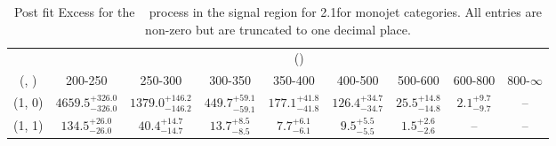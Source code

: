 \begin{table}[h!]
\tiny
\centering
\caption{Post fit Excess for the \zInv~ process in the signal region for 2.1\ifb for monojet categories. All entries are non-zero but are truncated to one decimal place.\label{tab:excessseppost_sig_zinv_mono}}
\begin{tabular}
{ccccccccc}
	\hline\hline
	& \multicolumn{8}{c}{\scalht (\gev)} \\ 
	 (\njet,  \nb) & 200-250 & 250-300 & 300-350 & 350-400 & 400-500 & 500-600 & 600-800 & 800-$\infty$ \\ [0.8ex] 
\hline
	(1, 0) & $4659.5^{+ 326.0 }_{- 326.0 }$ & $1379.0^{+ 146.2 }_{- 146.2 }$ & $449.7^{+ 59.1 }_{- 59.1 }$ & $177.1^{+ 41.8 }_{- 41.8 }$ & $126.4^{+ 34.7 }_{- 34.7 }$ & $25.5^{+ 14.8 }_{- 14.8 }$ & $2.1^{+ 9.7 }_{- 9.7 }$ & -- \\[0.5ex] 
	(1, 1) & $134.5^{+ 26.0 }_{- 26.0 }$ & $40.4^{+ 14.7 }_{- 14.7 }$ & $13.7^{+ 8.5 }_{- 8.5 }$ & $7.7^{+ 6.1 }_{- 6.1 }$ & $9.5^{+ 5.5 }_{- 5.5 }$ & $1.5^{+ 2.6 }_{- 2.6 }$ & -- & -- \\[0.5ex] 
	\hline
	\hline
\end{tabular}
\end{table}
